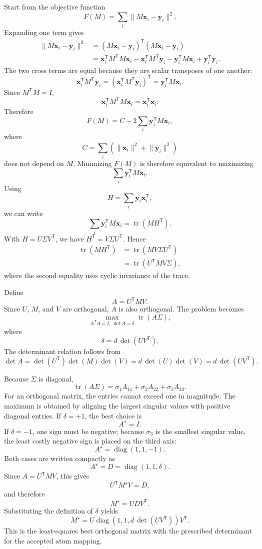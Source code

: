 \documentclass[11pt]{article}
\newcommand{\T}{\mathsf{T}}
\begin{document}
Start from the objective function
\[
    F(M)
    =
    \sum_i
    \lVert M\mathbf x_i-\mathbf y_i\rVert^2.
\]
Expanding one term gives
\[
\begin{aligned}
    \lVert M\mathbf x_i-\mathbf y_i\rVert^2
    &=
    (M\mathbf x_i-\mathbf y_i)^{\T}
    (M\mathbf x_i-\mathbf y_i)\\
    &=
    \mathbf x_i^{\T}M^{\T}M\mathbf x_i
    -
    \mathbf x_i^{\T}M^{\T}\mathbf y_i
    -
    \mathbf y_i^{\T}M\mathbf x_i
    +
    \mathbf y_i^{\T}\mathbf y_i.
\end{aligned}
\]
The two cross terms are equal because they are scalar transposes of one another:
\[
    \mathbf x_i^{\T}M^{\T}\mathbf y_i
    =
    \left(\mathbf x_i^{\T}M^{\T}\mathbf y_i\right)^{\T}
    =
    \mathbf y_i^{\T}M\mathbf x_i.
\]
Since \(M^{\T}M=I\),
\[
    \mathbf x_i^{\T}M^{\T}M\mathbf x_i
    =
    \mathbf x_i^{\T}\mathbf x_i.
\]
Therefore
\[
    F(M)
    =
    C
    -
    2\sum_i\mathbf y_i^{\T}M\mathbf x_i,
\]
where
\[
    C=
    \sum_i
    \left(
    \lVert\mathbf x_i\rVert^2+
    \lVert\mathbf y_i\rVert^2
    \right)
\]
does not depend on \(M\).  Minimizing \(F(M)\) is therefore equivalent to
maximizing
\[
    \sum_i\mathbf y_i^{\T}M\mathbf x_i.
\]
Using
\[
    H=\sum_i\mathbf y_i\mathbf x_i^{\T},
\]
we can write
\[
    \sum_i\mathbf y_i^{\T}M\mathbf x_i
    =
    \operatorname{tr}(MH^{\T}).
\]
With \(H=U\Sigma V^{\T}\), we have \(H^{\T}=V\Sigma U^{\T}\).  Hence
\[
\begin{aligned}
    \operatorname{tr}(MH^{\T})
    &=
    \operatorname{tr}(MV\Sigma U^{\T})\\
    &=
    \operatorname{tr}(U^{\T}MV\Sigma),
\end{aligned}
\]
where the second equality uses cyclic invariance of the trace.

Define
\[
    A=U^{\T}MV.
\]
Since \(U\), \(M\), and \(V\) are orthogonal, \(A\) is also orthogonal.  The
problem becomes
\[
    \max_{A^{\T}A=I,\ \det A=\delta}
    \operatorname{tr}(A\Sigma),
\]
where
\[
    \delta=d\,\det(UV^{\T}).
\]
The determinant relation follows from
\[
    \det A
    =
    \det(U^{\T})\det(M)\det(V)
    =
    d\,\det(U)\det(V)
    =
    d\,\det(UV^{\T}).
\]

Because \(\Sigma\) is diagonal,
\[
    \operatorname{tr}(A\Sigma)
    =
    \sigma_1 A_{11}+\sigma_2 A_{22}+\sigma_3 A_{33}.
\]
For an orthogonal matrix, the entries cannot exceed one in magnitude.  The
maximum is obtained by aligning the largest singular values with positive
diagonal entries.  If \(\delta=+1\), the best choice is
\[
    A^\star=I.
\]
If \(\delta=-1\), one sign must be negative; because
\(\sigma_3\) is the smallest singular value, the least costly negative sign is
placed on the third axis:
\[
    A^\star=\operatorname{diag}(1,1,-1).
\]
Both cases are written compactly as
\[
    A^\star
    =
    D
    =
    \operatorname{diag}(1,1,\delta).
\]
Since \(A=U^{\T}MV\), this gives
\[
    U^{\T}M^\star V=D,
\]
and therefore
\[
    M^\star=UDV^{\T}.
\]
Substituting the definition of \(\delta\) yields
\[
    \boxed{
    M^\star
    =
    U
    \operatorname{diag}
    \left(1,1,d\,\det(UV^{\T})\right)
    V^{\T}
    }.
\]
This is the least-squares best orthogonal matrix with the prescribed
determinant for the accepted atom mapping.
\end{document}
